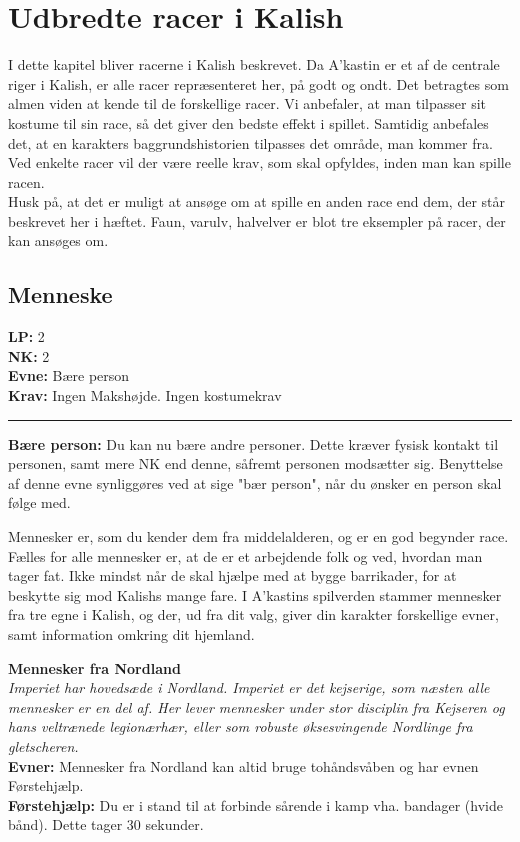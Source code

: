 \chapter*{Udbredte racer i Kalish}
I dette kapitel bliver racerne i Kalish beskrevet. Da A’kastin er et af de centrale riger i Kalish, er alle racer repræsenteret her, på godt og ondt. Det betragtes som almen viden at kende til de forskellige racer. Vi anbefaler, at man tilpasser sit kostume til sin race, så det giver den bedste effekt i spillet. Samtidig anbefales det, at en karakters baggrundshistorien tilpasses det område, man kommer fra. Ved enkelte racer vil der være reelle krav, som skal opfyldes, inden man kan spille racen.\\
Husk på, at det er muligt at ansøge om at spille en anden race end dem, der står beskrevet her i hæftet. Faun, varulv, halvelver er blot tre eksempler på racer, der kan ansøges om.\\

\section*{Menneske}
\begin{race*}[Mennesker]
\textbf{LP:} 2\\ 
\textbf{NK:} 2\\ 
\textbf{Evne:} Bære person\\
\textbf{Krav:} Ingen Makshøjde. Ingen kostumekrav\\
\rule{\textwidth}{0.4pt}
\textbf{Bære person:} Du kan nu bære andre personer. Dette kræver fysisk kontakt til personen, samt mere NK end denne, såfremt personen modsætter sig. Benyttelse af denne evne synliggøres ved at sige "bær person", når du ønsker en person skal følge med.\\
\end{race*}

Mennesker er, som du kender dem fra middelalderen, og er en god begynder race.\\
Fælles for alle mennesker er, at de er et arbejdende folk og ved, hvordan man tager fat. Ikke mindst når de skal hjælpe med at bygge barrikader, for at beskytte sig mod Kalishs mange fare. I A’kastins spilverden stammer mennesker fra tre egne i Kalish, og der, ud fra dit valg, giver din karakter forskellige evner, samt information omkring dit hjemland. 

\textbf{Mennesker fra Nordland}\\
\textit{Imperiet har hovedsæde i Nordland. Imperiet er det kejserige, som næsten alle mennesker er en del af. Her lever mennesker under stor disciplin fra Kejseren og hans veltrænede legionærhær, eller som robuste øksesvingende Nordlinge fra gletscheren.}\\
\textbf{Evner:} Mennesker fra Nordland kan altid bruge tohåndsvåben og har evnen Førstehjælp.\\
\textbf{Førstehjælp:} Du er i stand til at forbinde sårende i kamp vha. bandager (hvide bånd). Dette tager 30 sekunder.\\

